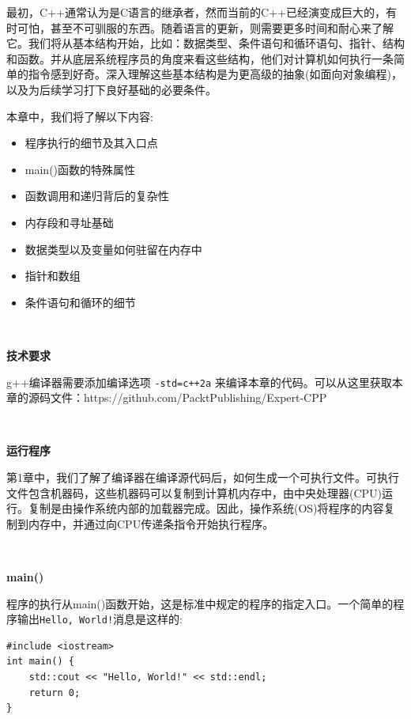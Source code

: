 最初，C++通常认为是C语言的继承者，然而当前的C++已经演变成巨大的，有时可怕，甚至不可驯服的东西。随着语言的更新，则需要更多时间和耐心来了解它。我们将从基本结构开始，比如：数据类型、条件语句和循环语句、指针、结构和函数。并从底层系统程序员的角度来看这些结构，他们对计算机如何执行一条简单的指令感到好奇。深入理解这些基本结构是为更高级的抽象(如面向对象编程)，以及为后续学习打下良好基础的必要条件。 \par
本章中，我们将了解以下内容: \par

\begin{itemize}
	\item 程序执行的细节及其入口点
	\item main()函数的特殊属性
	\item 函数调用和递归背后的复杂性
	\item 内存段和寻址基础
	\item 数据类型以及变量如何驻留在内存中
	\item 指针和数组
	\item 条件语句和循环的细节
\end{itemize}

\noindent\textbf{}\ \par
\textbf{技术要求} \ \par
g++编译器需要添加编译选项 \texttt{-std=c++2a} 来编译本章的代码。可以从这里获取本章的源码文件：https:/​/github.​com/PacktPublishing/Expert-CPP \par

\noindent\textbf{}\ \par
\textbf{运行程序} \ \par
第1章中，我们了解了编译器在编译源代码后，如何生成一个可执行文件。可执行文件包含机器码，这些机器码可以复制到计算机内存中，由中央处理器(CPU)运行。复制是由操作系统内部的加载器完成。因此，操作系统(OS)将程序的内容复制到内存中，并通过向CPU传递条指令开始执行程序。 \par

\noindent\textbf{}\ \par
\textbf{main()} \ \par
程序的执行从main()函数开始，这是标准中规定的程序的指定入口。一个简单的程序输出\texttt{Hello, World!}消息是这样的: \par

\begin{lstlisting}[caption={}]
#include <iostream>
int main() {
	std::cout << "Hello, World!" << std::endl;
	return 0;
}	
\end{lstlisting}

